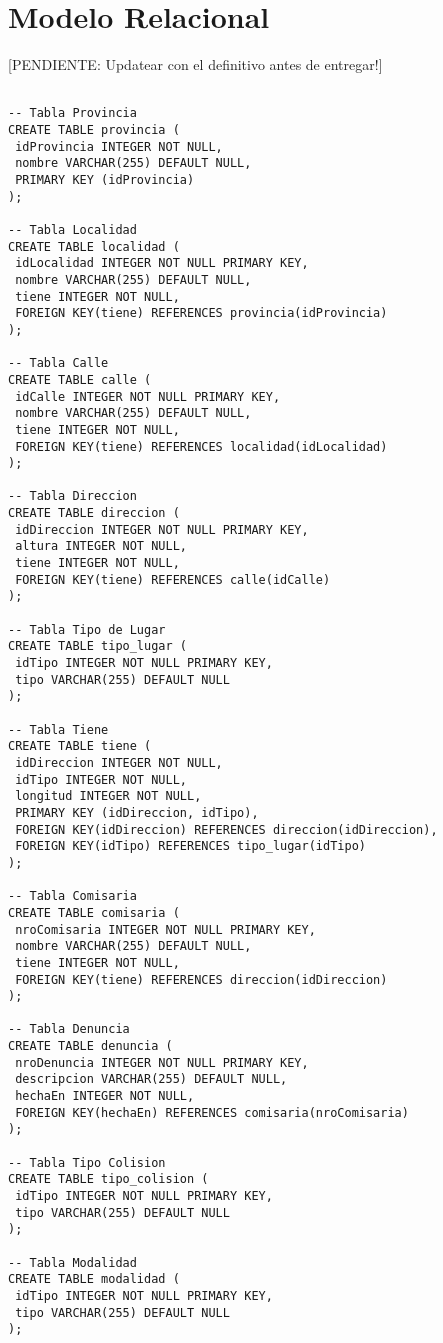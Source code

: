 \section{Modelo Relacional}

[PENDIENTE: Updatear con el definitivo antes de entregar!]

\begin{verbatim}

-- Tabla Provincia
CREATE TABLE provincia (
 idProvincia INTEGER NOT NULL,
 nombre VARCHAR(255) DEFAULT NULL,
 PRIMARY KEY (idProvincia)
);

-- Tabla Localidad
CREATE TABLE localidad (
 idLocalidad INTEGER NOT NULL PRIMARY KEY,
 nombre VARCHAR(255) DEFAULT NULL,
 tiene INTEGER NOT NULL,
 FOREIGN KEY(tiene) REFERENCES provincia(idProvincia)
);

-- Tabla Calle
CREATE TABLE calle (
 idCalle INTEGER NOT NULL PRIMARY KEY,
 nombre VARCHAR(255) DEFAULT NULL,
 tiene INTEGER NOT NULL,
 FOREIGN KEY(tiene) REFERENCES localidad(idLocalidad)
);

-- Tabla Direccion
CREATE TABLE direccion (
 idDireccion INTEGER NOT NULL PRIMARY KEY,
 altura INTEGER NOT NULL,
 tiene INTEGER NOT NULL,
 FOREIGN KEY(tiene) REFERENCES calle(idCalle)
);

-- Tabla Tipo de Lugar
CREATE TABLE tipo_lugar (
 idTipo INTEGER NOT NULL PRIMARY KEY,
 tipo VARCHAR(255) DEFAULT NULL
);

-- Tabla Tiene
CREATE TABLE tiene (
 idDireccion INTEGER NOT NULL,
 idTipo INTEGER NOT NULL,
 longitud INTEGER NOT NULL,
 PRIMARY KEY (idDireccion, idTipo),
 FOREIGN KEY(idDireccion) REFERENCES direccion(idDireccion),
 FOREIGN KEY(idTipo) REFERENCES tipo_lugar(idTipo)
);

-- Tabla Comisaria
CREATE TABLE comisaria (
 nroComisaria INTEGER NOT NULL PRIMARY KEY,
 nombre VARCHAR(255) DEFAULT NULL,
 tiene INTEGER NOT NULL,
 FOREIGN KEY(tiene) REFERENCES direccion(idDireccion)
);

-- Tabla Denuncia
CREATE TABLE denuncia (
 nroDenuncia INTEGER NOT NULL PRIMARY KEY,
 descripcion VARCHAR(255) DEFAULT NULL,
 hechaEn INTEGER NOT NULL,
 FOREIGN KEY(hechaEn) REFERENCES comisaria(nroComisaria)
);

-- Tabla Tipo Colision
CREATE TABLE tipo_colision (
 idTipo INTEGER NOT NULL PRIMARY KEY,
 tipo VARCHAR(255) DEFAULT NULL
);

-- Tabla Modalidad
CREATE TABLE modalidad (
 idTipo INTEGER NOT NULL PRIMARY KEY,
 tipo VARCHAR(255) DEFAULT NULL
);


\end{verbatim}
